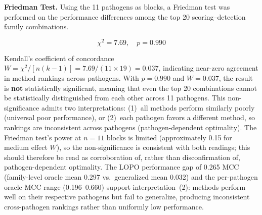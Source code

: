 \textbf{Friedman Test.}
\label{subsec:9pathogen_friedman}
Using the 11 pathogens as blocks, a Friedman test was performed on the performance differences among the top 20 scoring--detection family combinations.

\begin{equation}
\chi^2 = 7.69, \quad p = 0.990
\end{equation}

Kendall's coefficient of concordance $W = \chi^2 / [n(k-1)] = 7.69 / (11 \times 19) = 0.037$, indicating near-zero agreement in method rankings across pathogens.
With $p = 0.990$ and $W = 0.037$, the result is \textbf{not} statistically significant, meaning that even the top 20 combinations cannot be statistically distinguished from each other across 11 pathogens.
This non-significance admits two interpretations: (1)~all methods perform similarly poorly (universal poor performance), or (2)~each pathogen favors a different method, so rankings are inconsistent across pathogens (pathogen-dependent optimality). The Friedman test's power at $n = 11$ blocks is limited (approximately 0.15 for medium effect $W$), so the non-significance is consistent with both readings; this should therefore be read as corroboration of, rather than disconfirmation of, pathogen-dependent optimality.
The LOPO performance gap of 0.265 MCC (family-level oracle mean 0.297 vs.\ generalized mean 0.032) and the per-pathogen oracle MCC range (0.196--0.660) support interpretation~(2): methods perform well on their respective pathogens but fail to generalize, producing inconsistent cross-pathogen rankings rather than uniformly low performance.

